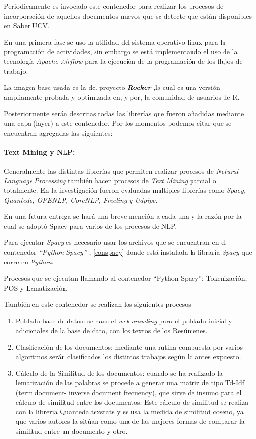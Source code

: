 \documentclass[
  10,
  spanish,
  openany]{book}
\begin{document}
Periodicamente es invocado este contenedor para realizar los procesos de incorporación de aquellos documentos nuevos que se detecte que están disponibles en Saber UCV.

En una primera fase se uso la utilidad del sistema operativo linux para la programación de actividades, sin embargo se está implementando el uso de la tecnología \emph{Apache Airflow} para la ejecución de la programación de los flujos de trabajo.

La imagen base usada es la del proyecto \textbf{\emph{Rocker}} \citep{RJ-2017-065:2017} ,la cual es una versión ampliamente probada y optimizada en, y por, la comunidad de usuarios de R.

Posteriormente serán descritas todas las librerías que fueron añadidas mediante una capa (layer) a este contenedor. Por los momentos podemos citar que se encuentran agregadas las siguientes:

\hypertarget{text-mining-y-nlp}{%
\paragraph{Text Mining y NLP:}\label{text-mining-y-nlp}}

Generalmente las distintas librerías que permiten realizar procesos de \emph{Natural Language Processing} también hacen procesos de \emph{Text Mining} parcial o totalmente. En la investigación fueron evaluadas múltiples librerías como \emph{Spacy, Quanteda, OPENLP, CoreNLP, Freeling y Udpipe}.

En una futura entrega se hará una breve mención a cada una y la razón por la cual se adoptó Spacy para varios de los procesos de NLP.

Para ejecutar \emph{Spacy} es necesario usar los archivos que se encuentran en el contenedor \emph{``Python Spacy''} , \ref{conspacy} donde está instalada la libraría \emph{Spacy} que corre en \emph{Python}.

Procesos que se ejecutan llamando al contenedor ``Python Spacy'': Tokenización, POS y Lematización.

También en este contenedor se realizan los siguientes procesos:

\begin{enumerate}
\def\labelenumi{\arabic{enumi}.}
\item
  Poblado base de datos: se hace el \emph{web crawling} para el poblado inicial y adicionales de la base de dato, con los textos de los Resúmenes.
\item
  Clasificación de los documentos: mediante una rutina compuesta por varios algoritmos serán clasificados los distintos trabajos según lo antes expuesto.
\item
  Cálculo de la Similitud de los documentos: cuando se ha realizado la lematización de las palabras se procede a generar una matriz de tipo Td-Idf (term document- inverse document frecuency), que sirve de insumo para el cálculo de similitud entre los documentos. Este cálculo de similitud se realiza con la librería Quanteda.texstats y se usa la medida de similitud coseno, ya que varios autores la sitúan como una de las mejores formas de comparar la similitud entre un documento y otro.
\end{enumerate}
\end{document}
